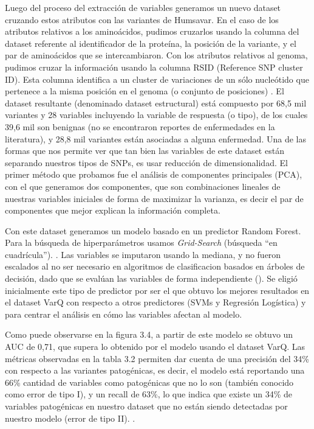 Luego del proceso del extracción de variables generamos un nuevo dataset cruzando estos atributos con las variantes de Humsavar. En el caso de los atributos relativos a los aminoácidos, pudimos cruzarlos usando la columna del dataset referente al identificador de la proteína, la posición de la variante, y el par de aminoácidos que se intercambiaron. Con los atributos relativos al genoma, pudimos cruzar la información usando la columna RSID (Reference SNP cluster ID). Esta columna identifica a un cluster de variaciones de un sólo nucleótido que pertenece a la misma posición en el genoma (o conjunto de posiciones) \cite{Ostell2007}. 
El dataset resultante (denominado dataset estructural) está compuesto por 68,5 mil variantes y 28 variables incluyendo la variable de respuesta (o tipo), de los cuales 39,6 mil son benignas (no se encontraron reportes de enfermedades en la literatura), y 28,8 mil variantes están asociadas a alguna enfermedad. 
Una de las formas que nos permite ver que tan bien las variables de este dataset están separando nuestros tipos de SNPs, es usar reducción de dimensionalidad. El primer método que probamos fue el análisis de componentes principales (PCA), con el que generamos dos componentes, que son combinaciones lineales de nuestras variables iniciales de forma de maximizar la varianza, es decir el par de componentes que mejor explican la información completa.


Con este dataset generamos un modelo basado en un predictor Random Forest. Para la búsqueda de hiperparámetros usamos \textit{Grid-Search} (búsqueda ``en cuadrícula''). . Las variables se imputaron usando la mediana, y no fueron escalados al no ser necesario en algoritmos de clasificacion basados en árboles de decisión, dado que se evalúan las variables de forma independiente (). Se eligió inicialmente este tipo de predictor por ser el que obtuvo los mejores resultados en el dataset VarQ  con respecto a otros predictores (SVMs y Regresión Logística) y para centrar el análisis en cómo las variables afectan al modelo.  

Como puede observarse en la figura 3.4, a partir de este modelo se obtuvo un AUC de 0,71, que supera lo obtenido por el modelo usando el dataset VarQ. Las métricas observadas en la tabla 3.2 permiten dar cuenta de una precisión del 34\% con respecto a las variantes patogénicas, es decir, el modelo está reportando una 66\% cantidad de variables como patogénicas que no lo son (también conocido como error de tipo I), y un recall de 63\%, lo que indica que existe un 34\% de variables patogénicas en nuestro dataset que no están siendo detectadas por nuestro modelo (error de tipo II). .

